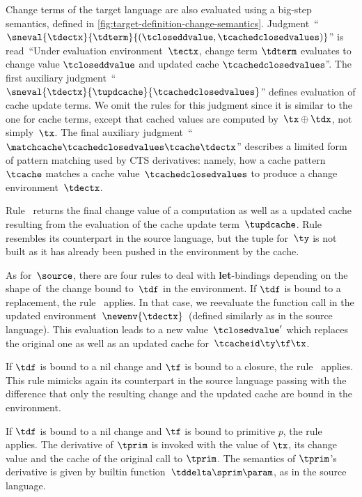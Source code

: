 Change terms of the target language are also evaluated using a
big-step semantics, defined in
\cref{fig:target-definition-change-semantics}.
Judgment~``$\sneval{\tdectx}{\tdterm}{(\tcloseddvalue,
  \tcachedclosedvalues)}$'' is read~``Under evaluation
environment~$\tectx$, change term $\tdterm$ evaluates to
change value $\tcloseddvalue$ and updated cache
$\tcachedclosedvalues$''. The first auxiliary
judgment~``$\sneval{\tdectx}{\tupdcache}{\tcachedclosedvalues}$''
defines evaluation of cache update terms. We omit the
rules for this judgment since it is similar to the one for cache terms,
except that cached values are computed by~$\tx \oplus \tdx$, not simply~$\tx$.
%
The final auxiliary
judgment~``$\matchcache\tcachedclosedvalues\tcache\tdectx$'' describes a limited
form of pattern matching used by CTS derivatives: namely,
how a cache pattern $\tcache$ matches a cache
value~$\tcachedclosedvalues$ to produce a change
environment~$\tdectx$.

Rule~ returns the final change value of a
computation as well as a updated cache resulting from the evaluation
of the cache update term~$\tupdcache$.
%
Rule~ resembles its counterpart in the
source language, but the tuple for~$\ty$ is not built as it has already been
pushed in the environment by the cache.

As for~$\source$, there are four rules to deal with {\bf
  let}-bindings depending on the shape of~the change bound to~$\tdf$
in the environment.
%
If $\tdf$ is bound to a replacement, the rule~ applies.
In that case, we reevaluate the function call in the updated
environment~$\newenv{\tdectx}$~(defined similarly as in the source
language). This evaluation leads to a new value~$\tclosedvalue'$
which replaces the original one as well as an updated cache
for~$\tcacheid\ty\tf\tx$.

If $\tdf$ is bound to a nil change and $\tf$ is bound to a closure, the
rule~ applies. This rule mimicks again its
counterpart in the source language passing with the difference that
only the resulting change and the updated cache are bound in the
environment.

If $\tdf$ is bound to a nil change and $\tf$ is bound to primitive $p$, the
rule~ applies. The derivative of $\tprim$
is invoked with the value of $\tx$, its change value and the
cache of the original call to $\tprim$. The semantics of $\tprim$'s
derivative is given by builtin function~$\tddelta\sprim\param$, as
in the source language.

